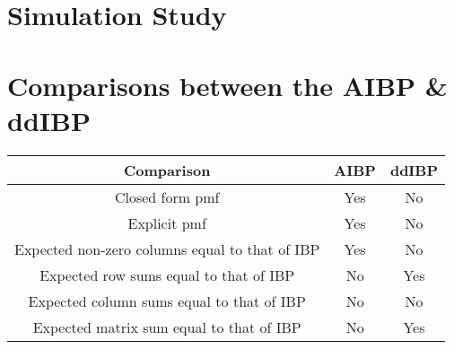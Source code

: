 \section{Simulation Study}

\section{Comparisons between the AIBP \& ddIBP}
\begin{center}
  \begin{tabular}{c|c|c}
    \hline
      Comparison & AIBP & ddIBP \\ \hline \hline
      Closed form pmf & Yes & No \\ \hline
      Explicit pmf & Yes & No \\ \hline
      Expected non-zero columns equal to that of IBP & Yes & No \\ \hline
      Expected row sums equal to that of IBP & No & Yes \\ \hline
      Expected column sums equal to that of IBP & No & No \\ \hline
      Expected matrix sum equal to that of IBP & No & Yes \\ \hline
    \hline
  \end{tabular}
\end{center}

